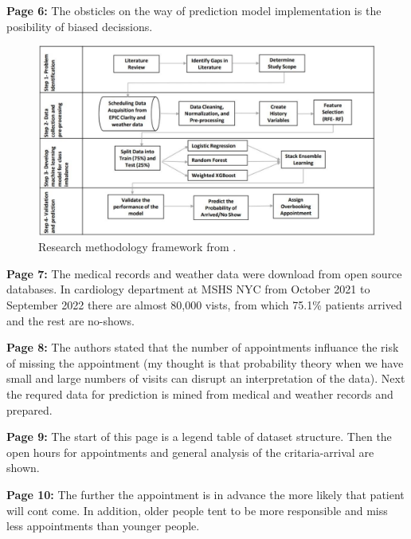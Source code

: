     \textbf{Page 6:}
    The obsticles on the way of prediction model implementation is the posibility of biased decissions.
    \begin{figure}[H]
        \centering
        \includegraphics[width=1\textwidth]{figures/0006_SM01US23/fig1.png}
        \caption{Research methodology framework from \cite{x147}.}
        \label{fig1:0006_SM01US23}
    \end{figure}

    \textbf{Page 7:}
    The medical records and weather data were download from open source databases. In cardiology department at MSHS NYC from October 2021 to September 2022 there are almost 80,000 vists, from which 75.1\% patients arrived and the rest are no-shows.

    \textbf{Page 8:}
    The authors stated that the number of appointments influance the risk of missing the appointment (my thought is that probability theory when we have small and large numbers of visits can disrupt an interpretation of the data). Next the requred data for prediction is mined from medical and weather records and prepared.

    \textbf{Page 9:}
    The start of this page is a legend table of dataset structure. Then the open hours for appointments and general analysis of the critaria-arrival are shown.
    
    \textbf{Page 10:}
    The further the appointment is in advance the more likely that patient will cont come. In addition, older people tent to be more responsible and miss less appointments than younger people.
    
